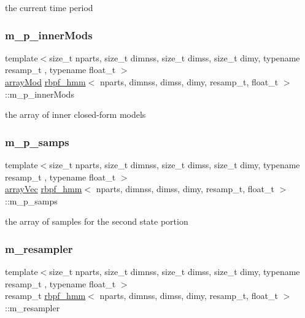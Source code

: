 the current time period \mbox{\label{classrbpf__hmm_a37251f098a509b771e20eae32d779f9d}} 
\subsubsection{\texorpdfstring{m\+\_\+p\+\_\+inner\+Mods}{m\_p\_innerMods}}
{\footnotesize\ttfamily template$<$size\+\_\+t nparts, size\+\_\+t dimnss, size\+\_\+t dimss, size\+\_\+t dimy, typename resamp\+\_\+t , typename float\+\_\+t $>$ \\
\hyperlink{classrbpf__hmm_a6dad2eb9cecbc6a85e348fec442c2998}{array\+Mod} \hyperlink{classrbpf__hmm}{rbpf\+\_\+hmm}$<$ nparts, dimnss, dimss, dimy, resamp\+\_\+t, float\+\_\+t $>$\+::m\+\_\+p\+\_\+inner\+Mods\hspace{0.3cm}{\ttfamily [private]}}

the array of inner closed-\/form models \mbox{\label{classrbpf__hmm_a6caeb30aae73ee88f4131103dbf1f84b}} 
\subsubsection{\texorpdfstring{m\+\_\+p\+\_\+samps}{m\_p\_samps}}
{\footnotesize\ttfamily template$<$size\+\_\+t nparts, size\+\_\+t dimnss, size\+\_\+t dimss, size\+\_\+t dimy, typename resamp\+\_\+t , typename float\+\_\+t $>$ \\
\hyperlink{classrbpf__hmm_a2154906d47b4eb987fe7c238d1aace0a}{array\+Vec} \hyperlink{classrbpf__hmm}{rbpf\+\_\+hmm}$<$ nparts, dimnss, dimss, dimy, resamp\+\_\+t, float\+\_\+t $>$\+::m\+\_\+p\+\_\+samps\hspace{0.3cm}{\ttfamily [private]}}

the array of samples for the second state portion \mbox{\label{classrbpf__hmm_ab298b91a0da6b09197915e337ca2b8a1}} 
\subsubsection{\texorpdfstring{m\+\_\+resampler}{m\_resampler}}
{\footnotesize\ttfamily template$<$size\+\_\+t nparts, size\+\_\+t dimnss, size\+\_\+t dimss, size\+\_\+t dimy, typename resamp\+\_\+t , typename float\+\_\+t $>$ \\
resamp\+\_\+t \hyperlink{classrbpf__hmm}{rbpf\+\_\+hmm}$<$ nparts, dimnss, dimss, dimy, resamp\+\_\+t, float\+\_\+t $>$\+::m\+\_\+resampler\hspace{0.3cm}{\ttfamily [private]}}

